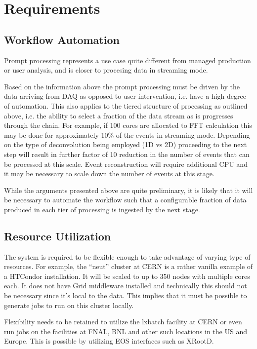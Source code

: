 \documentclass[pdftex,12pt,letter]{article}
\begin{document}
\section{Requirements}
\subsection{Workflow Automation}
Prompt processing represents a use case quite different from managed production or user analysis, and is closer to
procesing data in streaming mode.

Based on the information above the prompt processing must be driven by the data arriving from DAQ as opposed to user intervention, i.e. have a high degree
of automation. This also applies to the tiered structure of processing as outlined above, i.e. the ability to select a fraction of the data stream as is progresses
through the chain. For example, if 100 cores are allocated to FFT calculation this may be done for approximately 10\% of the events in streaming mode.
Depending on the type of deconvolution being employed (1D vs 2D) proceeding to the next step will result in further factor of 10 reduction in the number of
events that can be processed at this scale. Event reconstruction will require additional CPU and it may be necessary to scale down the number of
events at this stage.

While the arguments presented above are quite preliminary, it is likely that it will be necessary to automate the workflow such that a configurable fraction
of data produced in each tier of processing is ingested by the next stage.

\subsection{Resource Utilization}
The system is required to be flexible enough to take advantage of varying type of resources. For example, the ``neut'' cluster at CERN
is a rather vanilla example of a HTCondor installation. It will be scaled to up to 350 nodes with multiple cores each. It does not have Grid middleware
installed and technically this should not be necessary since it's local to the data. This implies that it must be possible to generate jobs to
run on this cluster locally.

Flexibility needs to be retained to utilize the lxbatch facility at CERN or even run jobs on the facilities at FNAL, BNL and other such locations
in the US and Europe. This is possible by utilizing EOS interfaces such as XRootD.
\end{document}
